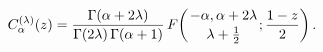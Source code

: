 \[\mathop{C^{(\lambda)}_{\alpha}\/}\nolimits\!\left(z\right)=\frac{\mathop{%
\Gamma\/}\nolimits\!\left(\alpha+2\lambda\right)}{\mathop{\Gamma\/}\nolimits\!%
\left(2\lambda\right)\mathop{\Gamma\/}\nolimits\!\left(\alpha+1\right)}\mathop%
{F\/}\nolimits\!\left({-\alpha,\alpha+2\lambda\atop\lambda+\tfrac{1}{2}};\frac%
{1-z}{2}\right).\]